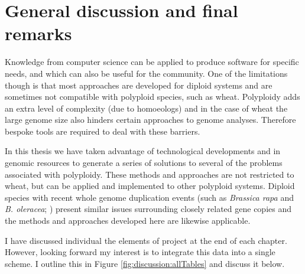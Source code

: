 
\chapter[General discussion]{General discussion and final remarks}
\glsresetall
\label{cha:discussion}



Knowledge from  computer science can be applied to produce software for specific needs, and which can also be useful for the community. 
One of the limitations though is that most approaches are developed for diploid systems and are sometimes not compatible with polyploid species, such as wheat. 
Polyploidy adds an extra level of complexity (due to homoeologs) and in the case of wheat the large genome size also hinders certain approaches to genome analyses. Therefore bespoke tools are required to deal with these barriers. 

In this thesis we have taken advantage of technological developments and in genomic resources to generate a series of solutions to several of the problems associated with polyploidy. These methods and approaches are not restricted to wheat, but can be applied and implemented to other polyploid systems.
Diploid species with recent whole genome duplication events (such as \textit{Brassica rapa} and \textit{B. oleracea}; \citealt{Cheng2014}) present similar issues surrounding closely related gene copies and the methods and approaches developed here are likewise applicable.

I have discussed individual the elements of project at the end of each chapter. However, looking forward my interest is to integrate this data into a single scheme. I outline this in Figure \ref{fig:discussion:allTables} and discuss it below. 

